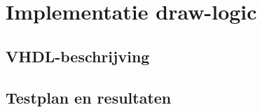 \documentclass{scrreprt} %
\date{22 november 2013}
\begin{document}
\chapter{Implementatie draw-logic}

\section{VHDL-beschrijving}


\section{Testplan en resultaten}
\end{document}
